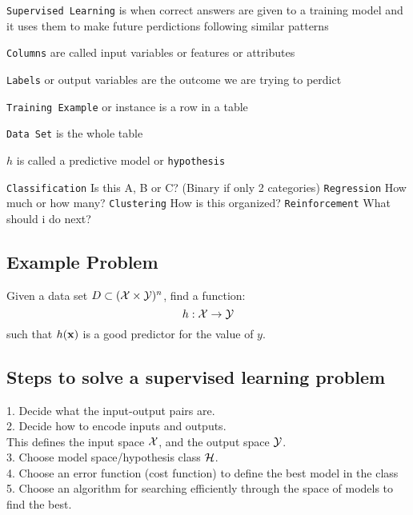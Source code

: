 \documentclass[10pt,landscape,a4paper]{cheatsheet}
\begin{document}
  \texttt{Supervised Learning} is when correct answers are given to a training model and it uses them to make future perdictions following similar patterns\newline

  \texttt{Columns} are called  input variables or features or attributes\newline

  \texttt{Labels} or output variables are the outcome we are trying to perdict\newline

  \texttt{Training Example} or instance is a row in a table\newline

  \texttt{Data Set} is the whole table\newline

  $h$ is called a predictive model or \texttt{hypothesis}\newline

  \texttt{Classification} Is this A, B or C? (Binary if only 2 categories)\newline
  \texttt{Regression} How much or how many?\newline
  \texttt{Clustering} How is this organized?\newline
  \texttt{Reinforcement} What should i do next?\newline

  \subsection{Example Problem} 
  Given a data set $D \subset ({{\cal X}}\times {{\cal Y}})^n$, find a function: $$h : {{\cal X}}\rightarrow {{\cal Y}}$$ 
  such that $h({\bf x})$ is a good predictor for the value of $y$.

  \subsection{Steps to solve a supervised learning problem}
  1.  Decide what the input-output pairs are.\\
  2.  Decide how to encode inputs and outputs.\\
      This defines the input space ${{\cal X}}$, and the output space
      ${{\cal Y}}$.\\
  3.  Choose model space/hypothesis class ${{\cal H}}$.\\
  4.  Choose an error function (cost function) to define the best
      model in the class\\
  5.  Choose an algorithm for searching efficiently through the space
      of models to find the best.\newline
\end{document}
